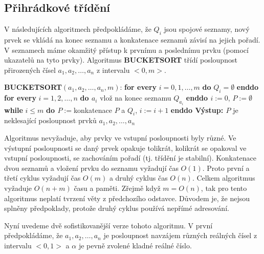 \documentclass[a4paper,12pt]{article}
\begin{document}
\subsection{{Přihrádkové třídění}}

V následujících algoritmech 
před\-po\-klá\-dáme, že $Q_i$ jsou spojové seznamy, nový 
prvek se vkládá na konec seznamu a konkatenace 
seznamů závisí na jejich pořadí. V 
seznamech máme okamžitý přístup k prvnímu a poslednímu 
prvku (pomocí ukazatelů na tyto prvky). 
Algoritmus {\bf BUCKETSORT} třídí posloupnost přirozených 
čísel $a_1,a_2,\dots,a_n$ z intervalu $<0,m>$.

{\bf BUCKETSORT$(a_1,a_2,\dots,a_n,m)$}:\newline 
{\bf \textsf{for every}} $i=0,1,\dots,m$ {\bf do} $Q_i=\emptyset$ {\bf enddo\newline 
\textsf{for every}} $i=1,2,\dots,n$ {\bf do\newline 
\phantom{{\rm ---}}$a_i$} vlož na konec seznamu $Q_{a_i}$\newline 
{\bf enddo\newline 
$i:=0$}, $P:=\emptyset$\newline 
{\bf while} $i\le m$ {\bf do\newline 
\phantom{{\rm ---}}$P:=$}konkatenace $P$ a $Q_i$, $i:=i+1$\newline 
{\bf enddo\newline 
Výstup: $P$} je neklesající posloupnost prvků 
$a_1,a_2,\dots,a_n$

Algoritmus nevyžaduje, aby prvky ve 
vstupní posloupnosti by\-ly různé. Ve výstupní 
posloupnosti se daný prvek opakuje tolikrát, kolikrát se 
opakoval ve vstupní posloupnosti, se zachováním pořadí 
(tj. třídění je stabilní). 
Konkatenace dvou seznamů a vložení prvku do seznamu 
vyžadují čas $O(1)$. Proto první a třetí cyklus vyžadují 
čas $O(m)$ a druhý cyklus čas $O(n)$. Celkem 
algoritmus vyžaduje $O(n+m)$ času a paměti. Zřejmě když  
$m=O(n)$, tak pro tento algoritmus neplatí tvrzení věty z 
předchozího odstavce. 
Důvodem je, 
že nejsou splněny předpoklady, protože druhý cyklus 
používá nepřímé adresování.

Nyní uvedeme dvě sofistikovanější verze tohoto 
algoritmu. V první předpokládáme, že 
$a_1,a_2,\dots,a_n$ je posloupnost navzájem různých reálných 
čísel z intervalu $<0,1>$ a $\alpha$ je pevně zvolené kladné 
reálné číslo.
\end{document}
